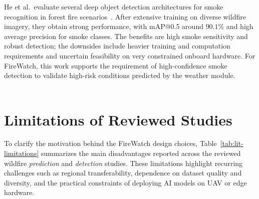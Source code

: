 \documentclass[11pt,a4paper]{report}
\begin{document}
He et al.\ evaluate several deep object detection architectures for smoke recognition in forest fire scenarios~\cite{he2025}. After extensive training on diverse wildfire imagery, they obtain strong performance, with mAP@0.5 around $90.1\%$ and high average precision for smoke classes. The benefits are high smoke sensitivity and robust detection; the downsides include heavier training and computation requirements and uncertain feasibility on very constrained onboard hardware. For FireWatch, this work supports the requirement of high-confidence smoke detection to validate high-risk conditions predicted by the weather module.
\\ \\ 

\section{Limitations of Reviewed Studies}

To clarify the motivation behind the FireWatch design choices, Table~\ref{tab:lit-limitations}
summarizes the main disadvantages reported across the reviewed wildfire \emph{prediction} and
\emph{detection} studies. These limitations highlight recurring challenges such as regional
transferability, dependence on dataset quality and diversity, and the practical constraints of
deploying AI models on UAV or edge hardware.
\end{document}
